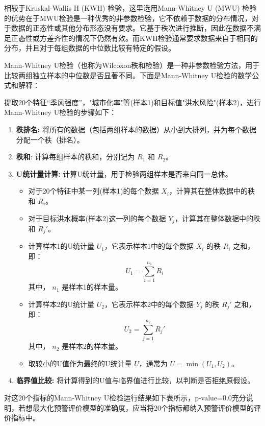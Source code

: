 \documentclass[withoutpreface,bwprint]{cumcmthesis} %
\begin{document}
相较于Kruskal-Wallis H (KWH) 检验，这里选用Mann-Whitney U (MWU) 检验的优势在于MWU检验是一种优秀的非参数检验，它不依赖于数据的分布情况，对于数据的正态性或其他分布形态没有要求。它基于秩次进行推断，因此在数据不满足正态性或方差齐性的情况下仍然有效。而KWH检验通常要求数据来自于相同的分布，并且对于每组数据的中位数比较有特定的假设。\cite{bib:one}

Mann-Whitney U检验（也称为Wilcoxon秩和检验）是一种非参数检验方法，用于比较两组独立样本的中位数是否显著不同。下面是Mann-Whitney U检验的数学公式和解释：

提取20个特征“季风强度”，"城市化率"等(样本1)和目标值"洪水风险"(样本2)，进行Mann-Whitney U检验的步骤如下：
\begin{enumerate}
	\item \textbf{秩排名:} 将所有的数据（包括两组样本的数据）从小到大排列，并为每个数据分配一个秩（排名）。
	\item \textbf{秩和}: 计算每组样本的秩和，分别记为 \( R_1 \) 和 \( R_2 \)。
	\item \textbf{U统计量计算: }计算U统计量，用于检验两组样本是否来自同一总体。
	\begin{itemize}
		\item 对于20个特征中某一列(样本1)的每个数据 \( X_i \)，计算其在整体数据中的秩和 \( R_i \)。
		\item 对于目标洪水概率(样本2)这一列的每个数据 \( Y_j \)，计算其在整体数据中的秩和 \( R_j' \)。
		\item 计算样本1的U统计量 \( U_1 \)，它表示样本1中的每个数据 \( X_i \) 的秩 \( R_i \) 之和，即：
		\begin{equation}
		U_1 = \sum_{i=1}^{n_1} R_i
		\end{equation}
		其中， \( n_1 \) 是样本1的样本量。
		\item 计算样本2的U统计量 \( U_2 \)，它表示样本2中的每个数据 \( Y_j \) 的秩 \( R_j' \) 之和，即：
		\begin{equation}
		U_2 = \sum_{j=1}^{n_2} R_j'
		\end{equation}
		其中， \( n_2 \) 是样本2的样本量。
		\item 取较小的U值作为最终的U统计量 \( U \)，通常为 \( U = \min(U_1, U_2) \)。
	\end{itemize}
	\item \textbf{临界值比较:} 将计算得到的U值与临界值进行比较，以判断是否拒绝原假设。
	
\end{enumerate}

对这20个指标的Mann-Whitney U检验运行结果如下表所示，p-value=0.0充分说明，若想最大化预警评价模型的准确度，应当将20个指标都纳入预警评价模型的评价指标中。
		
\end{document}
